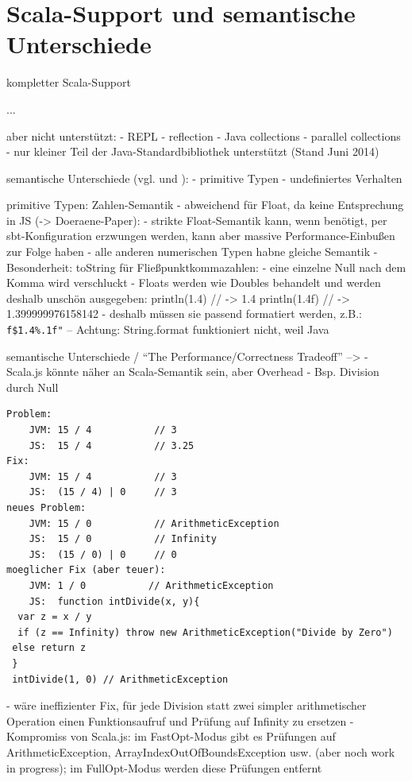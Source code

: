 \documentclass[a4paper, 12pt, hidelinks, listof=totoc, listoftables=totoc, bibliography=totoc]{scrreprt}
\begin{document}
\section{Scala-Support und semantische Unterschiede}

kompletter Scala-Support

...

aber nicht unterstützt:
- REPL
- reflection
- Java collections
- parallel collections
\cite{doeraene2013.CSJ}
- nur kleiner Teil der Java-Standardbibliothek unterstützt (Stand Juni 2014)\cite{doeraene2014.WHB}


semantische Unterschiede (vgl. \cite{doeraene2015.SSP} und \cite{scalajs.DSS}):
	- primitive Typen
	- undefiniertes Verhalten

primitive Typen: Zahlen-Semantik
	- abweichend für Float, da keine Entsprechung in JS (-> Doeraene-Paper):
    - strikte Float-Semantik kann, wenn benötigt, per sbt-Konfiguration erzwungen werden, kann aber massive Performance-Einbußen zur Folge haben
    - alle anderen numerischen Typen habne gleiche Semantik
    - Besonderheit: toString für Fließpunktkommazahlen:
    	- eine einzelne Null nach dem Komma wird verschluckt
    	- Floats werden wie Doubles behandelt und werden deshalb unschön ausgegeben:
    	println(1.4)  // -> 1.4
		println(1.4f) // -> 1.399999976158142
	- deshalb müssen sie passend formatiert werden, z.B.: \texttt{f\"\${1.4}\%.1f"}  --  Achtung: String.format funktioniert nicht, weil Java

semantische Unterschiede / "`The Performance/Correctness Tradeoff"' --> \cite[\#ThePerformance/CorrectnessTradeoff]{haoyi.HOS}
- Scala.js könnte näher an Scala-Semantik sein, aber Overhead
- Bsp. Division durch Null
\begin{lstlisting}
Problem:
	JVM: 15 / 4           // 3
	JS:  15 / 4           // 3.25
Fix:
	JVM: 15 / 4           // 3
	JS:  (15 / 4) | 0     // 3
neues Problem:
	JVM: 15 / 0           // ArithmeticException
	JS:  15 / 0           // Infinity
	JS:  (15 / 0) | 0     // 0
moeglicher Fix (aber teuer):
	JVM: 1 / 0           // ArithmeticException
	JS:  function intDivide(x, y){
  var z = x / y
  if (z == Infinity) throw new ArithmeticException("Divide by Zero")
 else return z
 }
 intDivide(1, 0) // ArithmeticException
\end{lstlisting}
	- wäre ineffizienter Fix, für jede Division statt zwei simpler arithmetischer Operation einen Funktionsaufruf und Prüfung auf Infinity zu ersetzen
	- Kompromiss von Scala.js: im FastOpt-Modus gibt es Prüfungen auf ArithmeticException,  ArrayIndexOutOfBoundsException usw. (aber noch work in progress); im FullOpt-Modus werden diese Prüfungen entfernt
\end{document}
